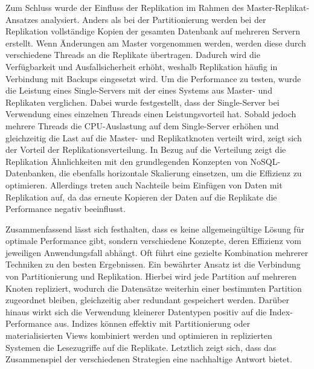 Zum Schluss wurde der Einfluss der Replikation im Rahmen des Master-Replikat-Ansatzes analysiert.
Anders als bei der Partitionierung werden bei der Replikation vollständige Kopien der gesamten Datenbank auf mehreren Servern erstellt.
Wenn Änderungen am Master vorgenommen werden, werden diese durch verschiedene Threads an die Replikate übertragen.
Dadurch wird die Verfügbarkeit und Ausfallsicherheit erhöht, weshalb Replikation häufig in Verbindung mit Backups eingesetzt wird.
Um die Performance zu testen, wurde die Leistung eines Single-Servers mit der eines Systems aus Master- und Replikaten verglichen.
Dabei wurde festgestellt, dass der Single-Server bei Verwendung eines einzelnen Threads einen Leistungsvorteil hat.
Sobald jedoch mehrere Threads die CPU-Auslastung auf dem Single-Server erhöhen und gleichzeitig die Last auf die Master- und Replikatknoten verteilt wird, zeigt sich der Vorteil der Replikationsverteilung.
In Bezug auf die Verteilung zeigt die Replikation Ähnlichkeiten mit den grundlegenden Konzepten von NoSQL-Datenbanken, die ebenfalls horizontale Skalierung einsetzen, um die Effizienz zu optimieren.
Allerdings treten auch Nachteile beim Einfügen von Daten mit Replikation auf, da das erneute Kopieren der Daten auf die Replikate die Performance negativ beeinflusst.

Zusammenfassend lässt sich festhalten, dass es keine allgemeingültige Lösung für optimale Performance gibt, sondern verschiedene Konzepte, deren Effizienz vom jeweiligen Anwendungsfall abhängt.
Oft führt eine gezielte Kombination mehrerer Techniken zu den besten Ergebnissen.
Ein bewährter Ansatz ist die Verbindung von Partitionierung und Replikation.
Hierbei wird jede Partition auf mehreren Knoten repliziert, wodurch die Datensätze weiterhin einer bestimmten Partition zugeordnet bleiben, gleichzeitig aber redundant gespeichert werden.
Darüber hinaus wirkt sich die Verwendung kleinerer Datentypen positiv auf die Index-Performance aus.
Indizes können effektiv mit Partitionierung oder materialisierten Views kombiniert werden und optimieren in replizierten Systemen die Lesezugriffe auf die Replikate.
Letztlich zeigt sich, dass das Zusammenspiel der verschiedenen Strategien eine nachhaltige Antwort bietet.